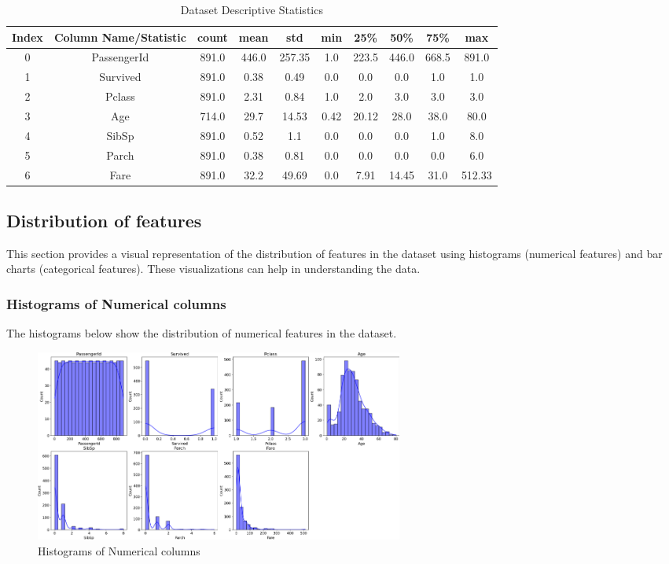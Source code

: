 \documentclass{article}%
\begin{document}
\begin{table}[h!]%
\caption{Dataset Descriptive Statistics}%
\vspace{0.2cm}%
\centering%
\begin{tabular}{|c||c||c||c||c||c||c||c||c||c|}%
\hline%
Index&Column Name/Statistic&count&mean&std&min&25\%&50\%&75\%&max\\%
\hline%
0&PassengerId&891.0&446.0&257.35&1.0&223.5&446.0&668.5&891.0\\%
1&Survived&891.0&0.38&0.49&0.0&0.0&0.0&1.0&1.0\\%
2&Pclass&891.0&2.31&0.84&1.0&2.0&3.0&3.0&3.0\\%
3&Age&714.0&29.7&14.53&0.42&20.12&28.0&38.0&80.0\\%
4&SibSp&891.0&0.52&1.1&0.0&0.0&0.0&1.0&8.0\\%
5&Parch&891.0&0.38&0.81&0.0&0.0&0.0&0.0&6.0\\%
6&Fare&891.0&32.2&49.69&0.0&7.91&14.45&31.0&512.33\\%
\hline%
\end{tabular}%
\end{table}

%
\newpage%
\subsection{Distribution of features}%
\label{subsec:Distributionoffeatures}%
This section provides a visual representation of the distribution of features in the dataset using histograms (numerical features) and bar charts (categorical features). These visualizations can help in understanding the data.%
\subsubsection{Histograms of Numerical columns}%
\label{ssubsec:HistogramsofNumericalcolumns}%
The histograms below show the distribution of numerical features in the dataset.%


\begin{figure}[h!]%
\centering%
\includegraphics[width=460px]{EDA/histograms.png}%
\caption{Histograms of Numerical columns}%
\end{figure}
\end{document}
